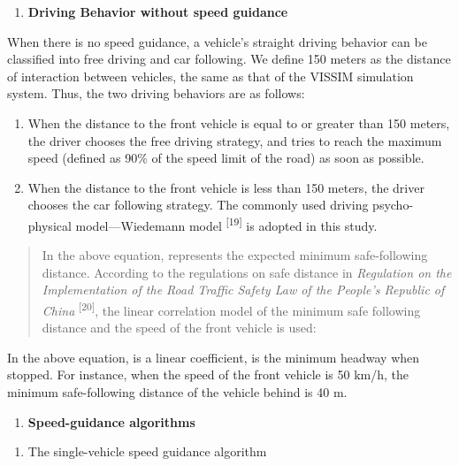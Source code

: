 \begin{enumerate}
\def\labelenumi{\arabic{enumi}.}
\item
  \textbf{Driving Behavior without speed guidance}
\end{enumerate}

When there is no speed guidance, a vehicle's straight driving behavior
can be classified into free driving and car following. We define 150
meters as the distance of interaction between vehicles, the same as that
of the VISSIM simulation system. Thus, the two driving behaviors are as
follows:

\begin{enumerate}
\def\labelenumi{\alph{enumi})}
\item
  When the distance to the front vehicle is equal to or greater than 150
  meters, the driver chooses the free driving strategy, and tries to
  reach the maximum speed (defined as 90\% of the speed limit of the
  road) as soon as possible.
\item
  When the distance to the front vehicle is less than 150 meters, the
  driver chooses the car following strategy. The commonly used driving
  psycho-physical model---Wiedemann model \textsuperscript{{[}19{]}} is
  adopted in this study.
\end{enumerate}

\begin{quote}
In the above equation, represents the expected minimum safe-following
distance. According to the regulations on safe distance in
\emph{Regulation on the Implementation of the Road Traffic Safety Law of
the People's Republic of China} \textsuperscript{{[}20{]}}, the linear
correlation model of the minimum safe following distance and the speed
of the front vehicle is used:
\end{quote}

In the above equation, is a linear coefficient, is the minimum headway
when stopped. For instance, when the speed of the front vehicle is 50
km/h, the minimum safe-following distance of the vehicle behind is 40 m.

\begin{enumerate}
\def\labelenumi{\arabic{enumi}.}
\item
  \textbf{Speed-guidance algorithms}
\end{enumerate}

\begin{enumerate}
\def\labelenumi{\arabic{enumi})}
\item
  The single-vehicle speed guidance algorithm
\end{enumerate}

